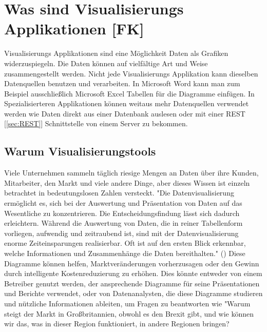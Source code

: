 \section{Was sind Visualisierungs Applikationen [FK]}\label{sec:visualization}
Visualisierungs Applikationen sind eine Möglichkeit Daten als Grafiken widerzuspiegeln. Die Daten können auf vielfältige Art und Weise zusammengestellt werden. Nicht jede Visualisierungs Applikation kann dieselben Datenquellen benutzen und verarbeiten. In Microsoft Word kann man zum Beispiel ausschließlich Microsoft Excel Tabellen für die Diagramme einfügen. In Spezialisierteren Applikationen können weitaus mehr Datenquellen verwendet werden wie Daten direkt aus einer Datenbank auslesen oder mit einer REST [\ref{sec:REST}] Schnittstelle von einem Server zu bekommen.
\subsection{Warum Visualisierungstools}
Viele Unternehmen sammeln täglich riesige Mengen an Daten über ihre Kunden, Mitarbeiter, den Markt und viele andere Dinge, aber dieses Wissen ist einzeln betrachtet in bedeutungslosen Zahlen versteckt.
"Die Datenvisualisierung ermöglicht es, sich bei der Auswertung und Präsentation von Daten auf das Wesentliche zu konzentrieren. Die Entscheidungsfindung lässt sich dadurch erleichtern. Während die Auswertung von Daten, die in reiner Tabellenform vorliegen, aufwendig und zeitraubend ist, sind mit der Datenvisualisierung enorme Zeiteinsparungen realisierbar. Oft ist auf den ersten Blick erkennbar, welche Informationen und Zusammenhänge die Daten bereithalten." (\cite{vorteileDV})
Diese Diagramme können helfen, Marktveränderungen vorherzusagen oder den Gewinn durch intelligente Kostenreduzierung zu erhöhen. 
Dies könnte entweder von einem Betreiber genutzt werden, der ansprechende Diagramme für seine Präsentationen und Berichte verwendet, oder von Datenanalysten, die diese Diagramme studieren und nützliche Informationen ableiten, um Fragen zu beantworten wie "Warum steigt der Markt in Großbritannien, obwohl es den Brexit gibt, und wie können wir das, was in dieser Region funktioniert, in andere Regionen bringen?

